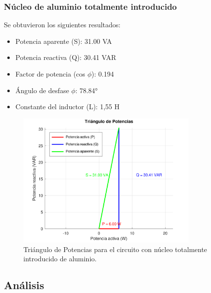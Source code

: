 \documentclass{article}
\begin{document}
                    \subsubsection{Núcleo de aluminio totalmente introducido}

                            Se obtuvieron los siguientes resultados:
                        \begin{itemize}
                            \item Potencia aparente (S): 31.00 VA
                            \item Potencia reactiva (Q): 30.41 VAR
                            \item Factor de potencia (cos $\phi$): 0.194
                            \item Ángulo de desfase $\phi$: 78.84°
                            \item Constante del inductor (L): 1,55 H
                        \end{itemize}

                        \begin{figure}[H]
                            \centering
                            \includegraphics[width=0.8\textwidth]{graficoTotalAluminio.png}
                            \caption{Triángulo de Potencias para el circuito con núcleo totalmente introducido de aluminio.}
                            \label{fig:graficoTotalAluminio}
                        \end{figure}
            
                        
        \subsection{Análisis}
        
\end{document}
